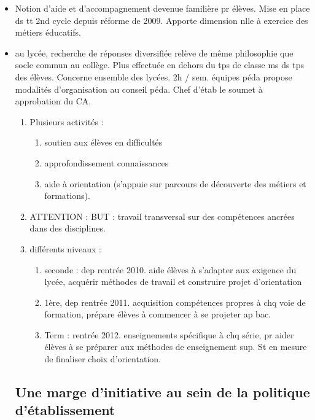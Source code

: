 \documentclass[12pt]{report}
\begin{document}
\begin{itemize}
\item Notion d'aide et d'accompagnement devenue familière pr élèves. Mise en place ds tt 2nd cycle depuis réforme de 2009. Apporte dimension nlle à exercice des métiers éducatifs. \\

\item au lycée, recherche de réponses diversifiée relève de même philosophie que socle commun au collège. Plus effectuée en dehors du tps de classe ms ds tps des élèves. Concerne ensemble des lycées. 2h / sem. équipes péda propose modalités d'organisation au conseil péda. Chef d'étab le soumet à approbation du CA. 

\begin{enumerate}


\item Plusieurs activités : 

\begin{enumerate}
\item soutien aux élèves en difficultés
\item approfondissement connaissances
\item aide à orientation (s'appuie sur parcours de découverte des métiers et formations).
\end{enumerate}
\item ATTENTION : BUT : travail transversal sur des compétences ancrées dans des disciplines. \\

\item différents niveaux : 
\begin{enumerate}
\item seconde : dep rentrée 2010. aide élèves à s'adapter aux exigence du lycée, acquérir méthodes de travail et construire projet d'orientation
\item 1ère, dep rentrée 2011. acquisition compétences propres à chq voie de formation, prépare élèves à commencer à se projeter ap bac. \\
\item  Term : rentrée 2012. enseignements spécifique à chq série, pr aider élèves à se préparer aux méthodes de enseignement sup. St en mesure de finaliser choix d'orientation. \\
\end{enumerate}
\end{enumerate}

\subsection{Une marge d'initiative au sein de la politique d'établissement}


\end{itemize}
\end{document}
